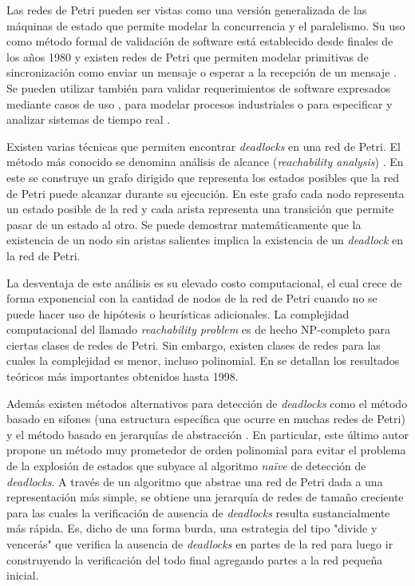 \documentclass[12pt]{article}
\begin{document}
Las redes de Petri pueden ser vistas como una versión generalizada de las máquinas de estado que permite modelar la concurrencia y el paralelismo.
Su uso como método formal de validación de software está establecido desde finales de los años 1980 y
existen redes de Petri que permiten modelar primitivas de sincronización como enviar un mensaje o esperar a la recepción de un mensaje \cite{heiner1998}.
Se pueden utilizar también para validar requerimientos de software expresados mediante casos de uso \cite{silva-dossantos2004},
para modelar procesos industriales \cite{aalst1994} o para especificar y analizar sistemas de tiempo real \cite{kavi2011}.

Existen varias técnicas que permiten encontrar \textit{deadlocks} en una red de Petri.
El método más conocido se denomina análisis de alcance (\textit{reachability analysis}) \cite{murata1989}.
En este se construye un grafo dirigido que representa los estados posibles que la red de Petri puede alcanzar durante su ejecución.
En este grafo cada nodo representa un estado posible de la red y cada arista representa una transición que permite pasar de un estado al otro.
Se puede demostrar matemáticamente que la existencia de un nodo sin aristas salientes implica la existencia de un \textit{deadlock} en la red de Petri.

La desventaja de este análisis es su elevado costo computacional, el cual crece de forma exponencial
con la cantidad de nodos de la red de Petri cuando no se puede hacer uso de hipótesis o heurísticas adicionales.
La complejidad computacional del llamado \textit{reachability problem} es de hecho NP-completo para ciertas clases de redes de Petri.
Sin embargo, existen clases de redes para las cuales la complejidad es menor, incluso polinomial.
En \cite{esparza1994} se detallan los resultados teóricos más importantes obtenidos hasta 1998.

Además existen métodos alternativos para detección de \textit{deadlocks}
como el método basado en sifones (una estructura específica que ocurre en muchas redes de Petri) \cite{hu2011} y
el método basado en jerarquías de abstracción \cite{kungas2005}.
En particular, este último autor propone un método muy prometedor de orden polinomial para evitar el problema
de la explosión de estados que subyace al algoritmo \textit{naïve} de detección de \textit{deadlocks}.
A través de un algoritmo que abstrae una red de Petri dada a una representación más simple,
se obtiene una jerarquía de redes de tamaño creciente para las cuales la verificación de ausencia de \textit{deadlocks} resulta sustancialmente más rápida.
Es, dicho de una forma burda, una estrategia del tipo "divide y vencerás" que verifica la ausencia de \textit{deadlocks}
en partes de la red para luego ir construyendo la verificación del todo final agregando partes a la red pequeña inicial.
\end{document}

